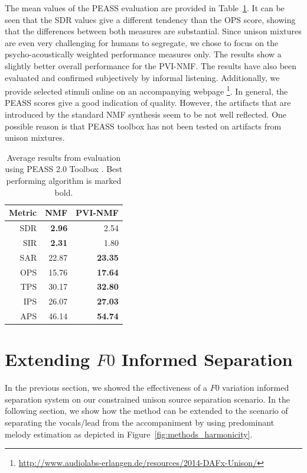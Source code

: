 The mean values of the PEASS evaluation are provided in Table~\ref{tab:results}. It can be seen that the SDR values give a different tendency than the OPS score, showing that the differences between both measures are substantial. Since unison mixtures are even very challenging for humans to segregate, we chose to focus on the psycho-acoustically weighted performance measures only. The results show a slightly better overall performance for the PVI-NMF.
The results have also been evaluated and confirmed subjectively by informal listening. Additionally, we provide selected stimuli online on an accompanying webpage \footnote{\url{http://www.audiolabs-erlangen.de/resources/2014-DAFx-Unison/}}. In general, the PEASS scores give a good indication of quality. However, the artifacts that are introduced by the standard NMF synthesis seem to be not well reflected. One possible reason is that PEASS toolbox has not been tested on artifacts from unison mixtures. \\

\begin{table}
\begin{center}
\small
\begin{tabular}{ r | r r }
  Metric & NMF & PVI-NMF \\
  \hline
  SDR & \textbf{2.96} & 2.54 \\
  SIR & \textbf{2.31} & 1.80 \\
  SAR & 22.87 & \textbf{23.35} \\
  \hline
  OPS & 15.76 & \textbf{17.64}\\
  TPS & 30.17 & \textbf{32.80}\\
  IPS & 26.07 & \textbf{27.03}\\
  APS & 46.14 & \textbf{54.74}\\
\end{tabular}
\end{center}
  \caption{Average results from evaluation using PEASS 2.0 Toolbox \cite{emiya11}. Best performing algorithm is marked bold.}
  \label{tab:results}
\end{table}

\section{Extending $F0$ Informed Separation}%
\label{sec:extendingf0}


In the previous section, we showed the effectiveness of a \(F0\) variation informed separation system on our constrained unison source separation scenario.
In the following section, we show how the method can be extended to the scenario of separating the vocals/lead from the accompaniment by using predominant melody estimation as depicted in Figure~\ref{fig:methods_harmonicity}.

